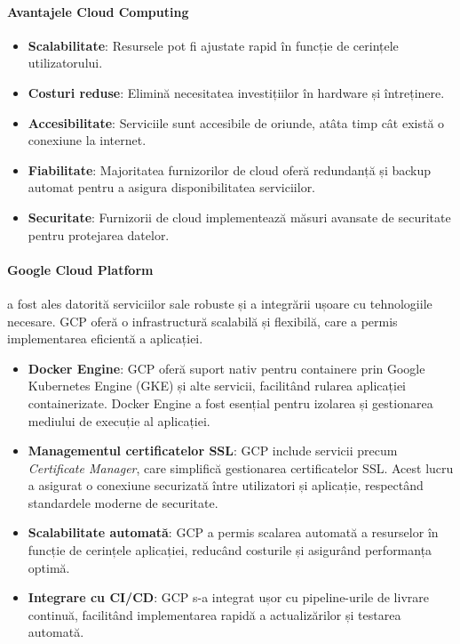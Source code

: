 \documentclass[titlepage,12pt]{article}
\begin{document}
\paragraph{Avantajele Cloud Computing}
\begin{itemize}
\item \textbf{Scalabilitate}: Resursele pot fi ajustate rapid în funcție de cerințele utilizatorului.
\item \textbf{Costuri reduse}: Elimină necesitatea investițiilor în hardware și întreținere.
\item \textbf{Accesibilitate}: Serviciile sunt accesibile de oriunde, atâta timp cât există o conexiune la internet.
\item \textbf{Fiabilitate}: Majoritatea furnizorilor de cloud oferă redundanță și backup automat pentru a asigura disponibilitatea serviciilor.
\item \textbf{Securitate}: Furnizorii de cloud implementează măsuri avansate de securitate pentru protejarea datelor.
\end{itemize}

\paragraph{Google Cloud Platform}
a fost ales datorită serviciilor sale robuste și a integrării ușoare cu tehnologiile necesare. \ac {GCP} oferă o infrastructură scalabilă și flexibilă, care a permis implementarea eficientă a aplicației.

\begin{itemize}
\item \textbf{Docker Engine}: GCP oferă suport nativ pentru containere prin Google Kubernetes Engine (GKE) și alte servicii, facilitând rularea aplicației containerizate. Docker Engine a fost esențial pentru izolarea și gestionarea mediului de execuție al aplicației.
\item \textbf{Managementul certificatelor SSL}: GCP include servicii precum \textit{Certificate Manager}, care simplifică gestionarea certificatelor SSL. Acest lucru a asigurat o conexiune securizată între utilizatori și aplicație, respectând standardele moderne de securitate.
\item \textbf{Scalabilitate automată}: GCP a permis scalarea automată a resurselor în funcție de cerințele aplicației, reducând costurile și asigurând performanța optimă.
\item \textbf{Integrare cu CI/CD}: GCP s-a integrat ușor cu pipeline-urile de livrare continuă, facilitând implementarea rapidă a actualizărilor și testarea automată.
\end{itemize}
\end{document}
